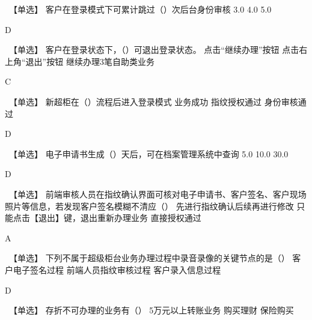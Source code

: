 \documentclass[kindlepaper]{BHCexam4kindle}
\begin{document}
\printanswers %
	\fubiaoti{}
	\maketitle
	\begin{questions}
\qs　【单选】 客户在登录模式下可累计跳过（）次后台身份审核 \xx
{} {  3.0 } { 4.0 } { 5.0 }
\begin{solution} D \end{solution}
\qs　【单选】 客户在登录状态下，（）可退出登录状态。 \xx
{} {  点击“继续办理”按钮 } { 点击右上角“退出”按钮 } { 继续办理3笔自助类业务 }
\begin{solution} C \end{solution}
\qs　【单选】 新超柜在（）流程后进入登录模式 \xx
{} {  业务成功 } { 指纹授权通过 } { 身份审核通过 }
\begin{solution} D \end{solution}
\qs　【单选】 电子申请书生成（）天后，可在档案管理系统中查询 \xx
{} {  5.0 } { 10.0 } { 30.0 }
\begin{solution} D \end{solution}
\qs　【单选】 前端审核人员在指纹确认界面可核对电子申请书、客户签名、客户现场照片等信息，若发现客户签名模糊不清应（） \xx
{} {  先进行指纹确认后续再进行修改 } { 只能点击【退出】键，退出重新办理业务 } { 直接授权通过 }
\begin{solution} A \end{solution}
\qs　【单选】 下列不属于超级柜台业务办理过程中录音录像的关键节点的是（） \xx
{} {  客户电子签名过程 } { 前端人员指纹审核过程 } { 客户录入信息过程 }
\begin{solution} D \end{solution}
\qs　【单选】 存折不可办理的业务有（） \xx
{} {  5万元以上转账业务 } { 购买理财 } { 保险购买 }

\end{questions}
\end{document}
